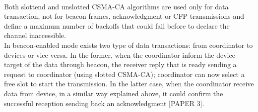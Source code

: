 \documentclass[conference]{IEEEtran}
\begin{document}
\\Both slottend and unslotted CSMA-CA algorithms are used only for data transaction, not for beacon frames, acknowledgment or CFP transmissions and define a maximum number of backoffs that could fail before to declare the channel inaccessible.
\\In beacon-enabled mode exists two type of data transactions: from coordinator to devices or vice versa. In the former, when the coordinator inform the device target of the data through beacon, the receiver reply that is ready sending a request to coordinator (using slotted CSMA-CA); coordinator can now select a free slot to start the transmission. In the latter case, when the coordinator receive data from device, in a similar way explained above, it could confirm the successful reception sending back an acknowledgment [PAPER 3]. 
\end{document}
